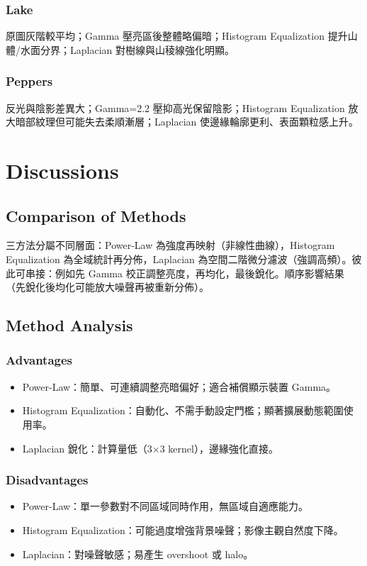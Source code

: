 \documentclass[12pt,a4paper]{article}
\begin{document}
\subsubsection{Lake} 原圖灰階較平均；Gamma 壓亮區後整體略偏暗；Histogram Equalization 提升山體/水面分界；Laplacian 對樹線與山稜線強化明顯。
\subsubsection{Peppers} 反光與陰影差異大；Gamma=2.2 壓抑高光保留陰影；Histogram Equalization 放大暗部紋理但可能失去柔順漸層；Laplacian 使邊緣輪廓更利、表面顆粒感上升。

\section{Discussions}
\subsection{Comparison of Methods}
三方法分屬不同層面：Power-Law 為強度再映射（非線性曲線），Histogram Equalization 為全域統計再分佈，Laplacian 為空間二階微分濾波（強調高頻）。彼此可串接：例如先 Gamma 校正調整亮度，再均化，最後銳化。順序影響結果（先銳化後均化可能放大噪聲再被重新分佈）。
\subsection{Method Analysis}
\subsubsection{Advantages}
\begin{itemize}
  \item Power-Law：簡單、可連續調整亮暗偏好；適合補償顯示裝置 Gamma。
  \item Histogram Equalization：自動化、不需手動設定門檻；顯著擴展動態範圍使用率。
  \item Laplacian 銳化：計算量低（3×3 kernel），邊緣強化直接。
\end{itemize}
\subsubsection{Disadvantages}
\begin{itemize}
  \item Power-Law：單一參數對不同區域同時作用，無區域自適應能力。
  \item Histogram Equalization：可能過度增強背景噪聲；影像主觀自然度下降。
  \item Laplacian：對噪聲敏感；易產生 overshoot 或 halo。
\end{itemize}
\end{document}

